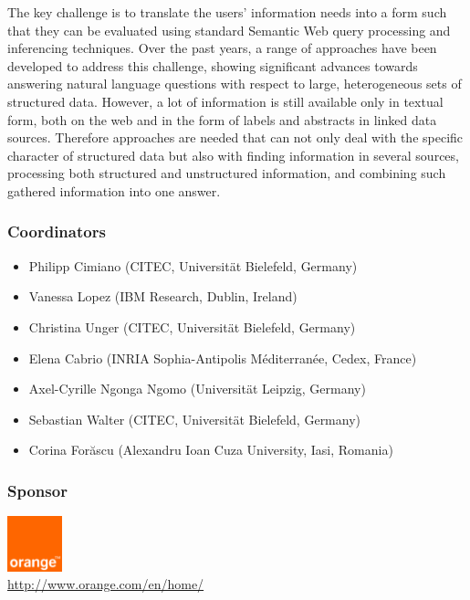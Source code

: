 \documentclass[a4paper]{article}
\begin{document}
{The key challenge is to translate the users' information needs into a form such that they can be evaluated using standard Semantic Web query processing and inferencing techniques. Over the past years, a range of approaches have been developed to address this challenge, showing significant advances towards answering natural language questions with respect to large, heterogeneous sets of structured data. However, %
a lot of information is still available only in textual form, both on the web and in the form of labels and abstracts in linked data sources. Therefore approaches are needed that can not only deal with the specific character of structured data but also with finding information in several sources, processing both structured and unstructured information, and combining such gathered information into one answer.


\subsubsection*{Coordinators} 

\begin{itemize}
\item Philipp Cimiano (CITEC, Universit\"at Bielefeld, Germany)
\item Vanessa Lopez (IBM Research, Dublin, Ireland)
\item Christina Unger (CITEC, Universit\"at Bielefeld, Germany)
\item Elena Cabrio (INRIA Sophia-Antipolis M\'editerran\'ee, Cedex, France)
\item Axel-Cyrille Ngonga Ngomo (Universit\"at Leipzig, Germany)
\item Sebastian Walter (CITEC, Universit\"at Bielefeld, Germany)
\item Corina For\u{a}scu (Alexandru Ioan Cuza University, Iasi, Romania)
\end{itemize}

\subsubsection*{Sponsor} 

\includegraphics[width=1.6cm]{logo.png}\\ \url{http://www.orange.com/en/home/}

}
\end{document}
